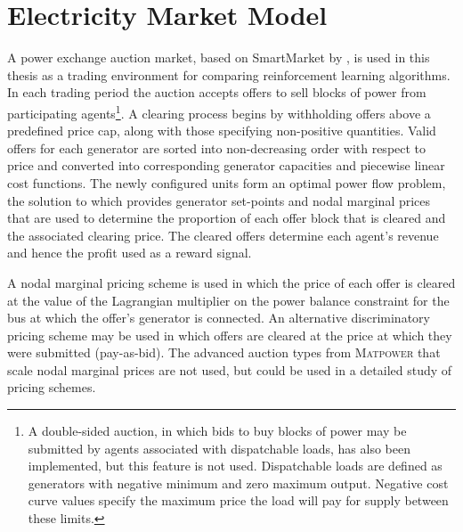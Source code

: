 \section{Electricity Market Model}
A power exchange auction market, based on SmartMarket by
, is used in this thesis as a trading environment
for comparing reinforcement learning algorithms.  In each trading period the
auction accepts offers to sell blocks of power from participating
agents\footnote{A double-sided auction, in which bids to buy blocks of power may
be submitted by agents associated with dispatchable loads, has also been
implemented, but this feature is not used. Dispatchable loads are defined as
generators with negative minimum and zero maximum output. Negative cost curve
values specify the maximum price the load will pay for supply between these
limits.}.
A clearing process begins by withholding offers above a predefined price cap,
along with those specifying non-positive quantities.  Valid offers for each
generator are sorted into non-decreasing order with respect to price and
converted into corresponding generator capacities and piecewise linear cost
functions.  The newly configured units form an optimal power flow problem, the
solution to which provides generator set-points and nodal marginal prices that
are used to determine the proportion of each offer block that is cleared and the
associated clearing price.  The cleared offers determine each agent's revenue
and hence the profit used as a reward signal.


A nodal marginal pricing scheme is used in which the price of each offer is
cleared at the value of the Lagrangian multiplier on the power balance
constraint for the bus at which the offer's generator is connected. An
alternative discriminatory pricing scheme may be used in which offers are
cleared at the price at which they were submitted (pay-as-bid).  The advanced
auction types from \textsc{Matpower} that scale nodal marginal prices are not
used, but could be used in a detailed study of pricing schemes.

